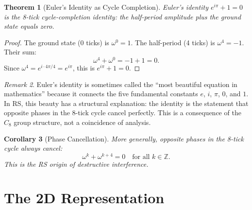 \documentclass[12pt,a4paper]{article}
\newtheorem{theorem}{Theorem}[section]
\newtheorem{corollary}[theorem]{Corollary}
\theoremstyle{definition}
\theoremstyle{remark}
\newtheorem{remark}[theorem]{Remark}
\begin{document}
\begin{theorem}[Euler's Identity as Cycle Completion]
\label{thm:euler}
Euler's identity $e^{i\pi} + 1 = 0$ is the 8-tick
cycle-completion identity: the half-period amplitude plus the
ground state equals zero.
\end{theorem}

\begin{proof}
The ground state (0 ticks) is $\omega^0 = 1$.  The half-period
(4 ticks) is $\omega^4 = -1$.  Their sum:
\begin{equation}
  \omega^4 + \omega^0 = -1 + 1 = 0.
\end{equation}
Since $\omega^4 = e^{i \cdot 4\pi/4} = e^{i\pi}$, this is
$e^{i\pi} + 1 = 0$.
\end{proof}

\begin{remark}
Euler's identity is sometimes called the ``most beautiful
equation in mathematics'' because it connects the five
fundamental constants $e$, $i$, $\pi$, $0$, and $1$.  In RS,
this beauty has a structural explanation: the identity is the
statement that opposite phases in the 8-tick cycle cancel
perfectly.  This is a consequence of the $C_8$ group structure,
not a coincidence of analysis.
\end{remark}

\begin{corollary}[Phase Cancellation]
\label{cor:cancel}
More generally, opposite phases in the 8-tick cycle always
cancel:
\begin{equation}
  \omega^k + \omega^{k+4} = 0 \quad
  \text{for all } k \in \mathbb{Z}.
\end{equation}
This is the RS origin of destructive interference.
\end{corollary}

\section{The 2D Representation}
\label{sec:2d}
\end{document}
